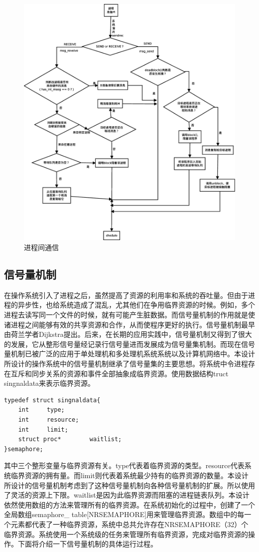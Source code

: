 \documentclass[UTF8,nofonts,cs4size]{ctexrep}
\begin{document}
\begin{figure}[htp]
\centering
\includegraphics[scale=0.34]{sendrecv.eps}
\caption{进程间通信}
\label{sendrecv}
\end{figure}
\subsection{信号量机制}
在操作系统引入了进程之后，虽然提高了资源的利用率和系统的吞吐量。但由于进程的异步性，也给系统造成了混乱，尤其他们在争用临界资源的时候。例如，多个进程去读写同一个文件的时候，就有可能产生脏数据。而信号量机制的作用就是使诸进程之间能够有效的共享资源和合作，从而使程序更好的执行。信号量机制最早由荷兰学者Dijkstra提出。后来，在长期的应用实践中，信号量机制又得到了很大的发展，它从整形信号量经记录行信号量进而发展成为信号量集机制。而现在信号量机制已被广泛的应用于单处理机和多处理机系统系统以及计算机网络中。本设计所设计的操作系统中的信号量机制继承了信号量集的主要思想。将系统中令进程存在互斥和同步关系的资源和事件全部抽象成临界资源。使用数据结构truct singnaldata来表示临界资源。
\begin{lstlisting}
typedef struct singnaldata{
	int		type;
	int		resource;
	int		limit;
    struct proc*		waitlist;
}semaphore;
\end{lstlisting}
其中三个整形变量与临界资源有关。type代表着临界资源的类型。resource代表系统临界资源的拥有量。而limit则代表着系统最少持有的临界资源的数量。本设计所设计的信号量机制考虑到了这种信号量机制向各种信号量机制的扩展。所以使用了灵活的资源上下限。waitlist是因为此临界资源而阻塞的进程链表队列。本设计依然使用数组的方法来管理所有的临界资源。在系统初始化的过程中，创建了一个全局数组semaphore\_ table[NRSEMAPHORE]用来管理临界资源。数组中的每一个元素都代表了一种临界资源，系统中总共允许存在NRSEMAPHORE（32）个临界资源。系统使用一个系统级的任务来管理所有临界资源，完成对临界资源的操作。下面将介绍一下信号量机制的具体运行过程。
\end{document}
